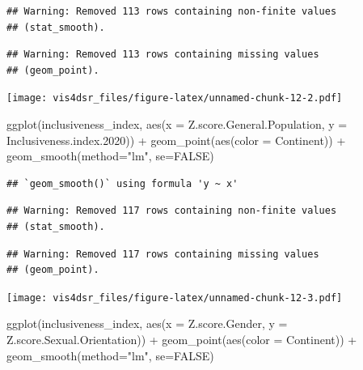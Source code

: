 \documentclass[
]{krantz}
\makeatletter
\newenvironment{Shaded}{\begin{snugshade}}{\end{snugshade}}
\newcommand{\AttributeTok}[1]{\textcolor[rgb]{0.61,0.61,0.61}{#1}}
\newcommand{\ConstantTok}[1]{\textcolor[rgb]{0,0,0}{#1}}
\newcommand{\FloatTok}[1]{\textcolor[rgb]{0.06,0.06,0.06}{#1}}
\newcommand{\FunctionTok}[1]{\textcolor[rgb]{0,0,0}{#1}}
\newcommand{\NormalTok}[1]{#1}
\newcommand{\SpecialCharTok}[1]{\textcolor[rgb]{0,0,0}{#1}}
\newcommand{\StringTok}[1]{\textcolor[rgb]{0.5,0.5,0.5}{#1}}
\newenvironment{kframe}{%
\medskip{}
\setlength{\fboxsep}{.8em}
 \def\at@end@of@kframe{}%
 \ifinner\ifhmode%
  \def\at@end@of@kframe{\end{minipage}}%
  \begin{minipage}{\columnwidth}%
 \fi\fi%
 \def\FrameCommand##1{\hskip\@totalleftmargin \hskip-\fboxsep
 \colorbox{shadecolor}{##1}\hskip-\fboxsep
     \hskip-\linewidth \hskip-\@totalleftmargin \hskip\columnwidth}%
 \MakeFramed {\advance\hsize-\width
   \@totalleftmargin\z@ \linewidth\hsize
   \@setminipage}}%
 {\par\unskip\endMakeFramed%
 \at@end@of@kframe}
\renewenvironment{Shaded}{\begin{kframe}}{\end{kframe}}
\makeatother
\begin{document}
\begin{verbatim}
## Warning: Removed 113 rows containing non-finite values
## (stat_smooth).
\end{verbatim}

\begin{verbatim}
## Warning: Removed 113 rows containing missing values
## (geom_point).
\end{verbatim}

\texttt{[image: vis4dsr\_files/figure-latex/unnamed-chunk-12-2.pdf]}

\begin{Shaded}
\begin{Highlighting}[]
\FunctionTok{ggplot}\NormalTok{(inclusiveness\_index, }
       \FunctionTok{aes}\NormalTok{(}\AttributeTok{x =}\NormalTok{ Z.score.General.Population, }
           \AttributeTok{y =}\NormalTok{ Inclusiveness.index}\FloatTok{.2020}\NormalTok{)) }\SpecialCharTok{+}
  \FunctionTok{geom\_point}\NormalTok{(}\FunctionTok{aes}\NormalTok{(}\AttributeTok{color =}\NormalTok{ Continent)) }\SpecialCharTok{+}
  \FunctionTok{geom\_smooth}\NormalTok{(}\AttributeTok{method=}\StringTok{"lm"}\NormalTok{, }\AttributeTok{se=}\ConstantTok{FALSE}\NormalTok{)}
\end{Highlighting}
\end{Shaded}

\begin{verbatim}
## `geom_smooth()` using formula 'y ~ x'
\end{verbatim}

\begin{verbatim}
## Warning: Removed 117 rows containing non-finite values
## (stat_smooth).
\end{verbatim}

\begin{verbatim}
## Warning: Removed 117 rows containing missing values
## (geom_point).
\end{verbatim}

\texttt{[image: vis4dsr\_files/figure-latex/unnamed-chunk-12-3.pdf]}

\begin{Shaded}
\begin{Highlighting}[]
\FunctionTok{ggplot}\NormalTok{(inclusiveness\_index, }
       \FunctionTok{aes}\NormalTok{(}\AttributeTok{x =}\NormalTok{ Z.score.Gender, }
           \AttributeTok{y =}\NormalTok{ Z.score.Sexual.Orientation)) }\SpecialCharTok{+}
  \FunctionTok{geom\_point}\NormalTok{(}\FunctionTok{aes}\NormalTok{(}\AttributeTok{color =}\NormalTok{ Continent)) }\SpecialCharTok{+}
  \FunctionTok{geom\_smooth}\NormalTok{(}\AttributeTok{method=}\StringTok{"lm"}\NormalTok{, }\AttributeTok{se=}\ConstantTok{FALSE}\NormalTok{)}
\end{Highlighting}
\end{Shaded}
\end{document}
